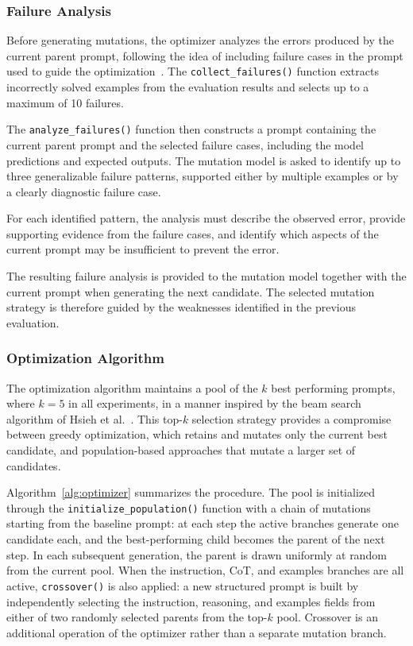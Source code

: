 \documentclass[pdflatex,sn-mathphys-num]{sn-jnl}%
\theoremstyle{thmstyleone}%
\theoremstyle{thmstyletwo}%
\theoremstyle{thmstylethree}%
\begin{document}

\subsubsection{Failure Analysis}

Before generating mutations, the optimizer analyzes the errors
produced by the current parent prompt, following the idea of including
failure cases in the prompt used to guide the optimization~\cite{ye2024}. 
The \texttt{collect\_failures()} function extracts incorrectly solved examples 
from the evaluation results and selects up to a maximum of 10 failures.

The \texttt{analyze\_failures()} function then constructs a prompt
containing the current parent prompt and the selected failure cases,
including the model predictions and expected outputs. The mutation
model is asked to identify up to three generalizable failure patterns,
supported either by multiple examples or by a clearly diagnostic
failure case.

For each identified pattern, the analysis must describe the observed
error, provide supporting evidence from the failure cases, and
identify which aspects of the current prompt may be insufficient
to prevent the error.

The resulting failure analysis is provided to the mutation model
together with the current prompt when generating the next candidate.
The selected mutation strategy is therefore guided by the weaknesses
identified in the previous evaluation.

\subsubsection{Optimization Algorithm}

The optimization algorithm maintains a pool of the \(k\) best
performing prompts, where \(k=5\) in all experiments, in a manner
inspired by the beam search algorithm of Hsieh et al.~\cite{hsieh2024}. 
This top-\(k\) selection strategy provides a compromise between greedy
optimization, which retains and mutates only the current best candidate, 
and population-based approaches that mutate a larger set of candidates.

Algorithm~\ref{alg:optimizer} summarizes the procedure. The pool is 
initialized through the \texttt{initialize\_population()} function with a 
chain of mutations starting from the baseline prompt: 
at each step the active branches generate one candidate each, and the 
best-performing child becomes the parent of the next step. In each 
subsequent generation, the parent is drawn uniformly at random from the 
current pool. When the instruction, CoT, and examples branches are all 
active, \texttt{crossover()} is also applied: a new structured prompt 
is built by independently selecting the instruction, reasoning, and examples 
fields from either of two randomly selected parents from the top-\(k\) pool. 
Crossover is an additional operation of the optimizer rather than a
separate mutation branch.
\end{document}
